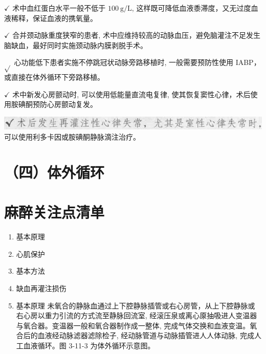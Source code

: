 \documentclass[10pt]{article}
\begin{document}
$\checkmark$ 术中血红蛋白水平一般不低于 $100 \mathrm{~g} / \mathrm{L}$, 这样既可降低血液黍滞度，又无过度血液稀释，保证血液的携氧量。

$\checkmark$ 合并颈动脉重度狭窄的患者, 术中应维持较高的动脉血压，避免脑灌注不足发生脑缺血，最好同时实施颈动脉内膜剥脱手术。

$\sqrt{ }$ 心功能低下患者实施不停跳冠状动脉旁路移植时, 一般需要预防性使用 IABP，或直接在体外循环下旁路移植。

$\checkmark$ 术中新发心房颤动时, 可以使用低能量直流电复律, 使其恢复窦性心律，术后使用胺碘酮预防心房颤动复发。

\includegraphics[max width=\textwidth, center]{2024_07_05_645bb794a4d4f32ee0c8g-240}\\
可以使用利多卡因或胺碘酮静脉滴注治疗。

\section*{（四）体外循环}
\section*{麻醉关注点清单}
\begin{enumerate}
  \item 基本原理

  \item 心肌保护

  \item 基本方法

  \item 缺血再灌注损伤

  \item 基本原理 未氧合的静脉血通过上下腔静脉插管或右心房管，从上下腔静脉或右心房以重力引流的方式流至静脉回流室, 经滚压泉或离心厡抽吸进人变温器与氧合器。变温器一般和氧合器制作成一整体, 完成气体交换和血液变温。氧合后的血液经动脉滤器滤除检子, 经动脉管道与动脉插管进人人体动脉, 完成人工血液循环。图 3-11-3 为体外循环示意图。

\end{enumerate}
\end{document}
